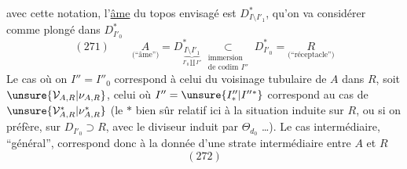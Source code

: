 avec cette notation, l'\uline{âme} du topos  envisagé est $D^*_{I\setminus I'_1}$, qu'on va considérer comme plongé dans $D^*_{I'_0}$
\[
(271)\qquad
\underset{\text{(``âme'')}}{A}=D^*_{\underbrace{I\setminus I'_1}_{I'_0\amalg I''}}
\underset{\substack{\text{immersion}\\\text{de codim }I''}}{\subset}
D^*_{I'_0}=\underset{\text{(``réceptacle'')}}{R}
\]
Le  cas où on  $I''=I''_0$ correspond à celui du voisinage tubulaire de  $A$ dans $R$, soit $\unsure{\mathcal V_{A,R}|\nu_{A,R}}$, celui où $I''=\unsure{I''_*|I''{}^*}$ correspond au cas de $\unsure{\mathcal V^*_{A,R}|\nu^*_{A,R}}$ (le $*$ bien sûr relatif ici à la situation induite sur $R$, ou si on préfère, sur $D_{I'_0}\supset R$, avec le diviseur induit par $\Theta_{d_0}$ \ldots). Le cas intermédiaire, ``général'', correspond donc à  la donnée d'une strate intermédiaire entre $A$ et $R$
\[
(272)
\]
